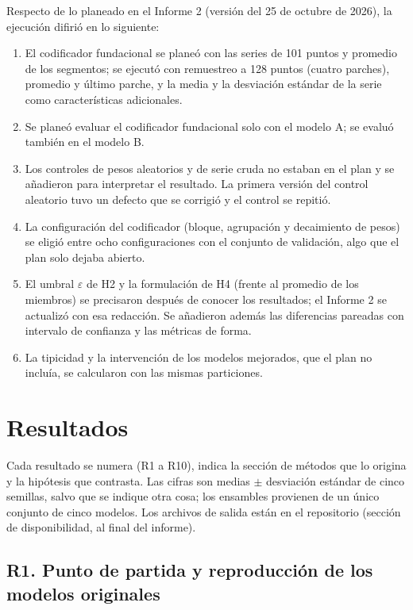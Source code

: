 \documentclass[11pt,a4paper]{article}
\begin{document}
Respecto de lo planeado en el Informe 2 (versión del 25 de octubre de 2026), la ejecución difirió en lo siguiente:
\begin{enumerate}[label=(\roman*)]
\item El codificador fundacional se planeó con las series de 101 puntos y promedio de los segmentos; se ejecutó con remuestreo a 128 puntos (cuatro parches), promedio y último parche, y la media y la desviación estándar de la serie como características adicionales.
\item Se planeó evaluar el codificador fundacional solo con el modelo A; se evaluó también en el modelo B.
\item Los controles de pesos aleatorios y de serie cruda no estaban en el plan y se añadieron para interpretar el resultado. La primera versión del control aleatorio tuvo un defecto que se corrigió y el control se repitió.
\item La configuración del codificador (bloque, agrupación y decaimiento de pesos) se eligió entre ocho configuraciones con el conjunto de validación, algo que el plan solo dejaba abierto.
\item El umbral $\varepsilon$ de H2 y la formulación de H4 (frente al promedio de los miembros) se precisaron después de conocer los resultados; el Informe 2 se actualizó con esa redacción. Se añadieron además las diferencias pareadas con intervalo de confianza y las métricas de forma.
\item La tipicidad y la intervención de los modelos mejorados, que el plan no incluía, se calcularon con las mismas particiones.
\end{enumerate}

\section{Resultados}
\label{sec:resultados}

Cada resultado se numera (R1 a R10), indica la sección de métodos que lo origina y la hipótesis que contrasta. Las cifras son medias $\pm$ desviación estándar de cinco semillas, salvo que se indique otra cosa; los ensambles provienen de un único conjunto de cinco modelos. Los archivos de salida están en el repositorio (sección de disponibilidad, al final del informe).

\subsection{R1. Punto de partida y reproducción de los modelos originales}
\label{sec:r1}
\end{document}
